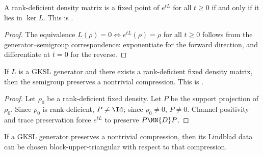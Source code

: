 \begin{theorem}
    \label{thm:wolf_prop_7_6_one_iff_two}
    \leanok
    A rank-deficient density matrix is a fixed point of $e^{tL}$ for all
    $t\ge0$ if and only if it lies in $\ker L$.
    This is \cite[Proposition~7.6, (1)$\Leftrightarrow$(2)]{Wolf2012Quantum}.
\end{theorem}

\begin{proof}\leanok
    The equivalence $L(\rho)=0\iff e^{tL}(\rho)=\rho$ for all $t\ge0$
    follows from the generator--semigroup correspondence: exponentiate for
    the forward direction, and differentiate at $t=0$ for the reverse.
\end{proof}

\begin{theorem}
    \label{thm:wolf_prop_7_6_one_implies_three}
    \leanok
    If $L$ is a GKSL generator and there exists a rank-deficient fixed
    density matrix, then the semigroup preserves a nontrivial compression.
    This is \cite[Proposition~7.6, (1)$\Rightarrow$(3)]{Wolf2012Quantum}.
\end{theorem}

\begin{proof}\leanok
    Let $\rho_0$ be a rank-deficient fixed density.
    Let $P$ be the support projection of $\rho_0$.
    Since $\rho_0$ is rank-deficient, $P\neq\Id$;
    since $\rho_0\neq0$, $P\neq0$.
    Channel positivity and trace preservation force $e^{tL}$ to
    preserve $P\MN{D}P$.
\end{proof}

\begin{theorem}
    \label{thm:hasBlockUpperTriangularLindblad_of_hasInvariantCompression_ch12}
    \leanok
    If a GKSL generator preserves a nontrivial compression, then its Lindblad data can be chosen
    block-upper-triangular with respect to that compression.
\end{theorem}

